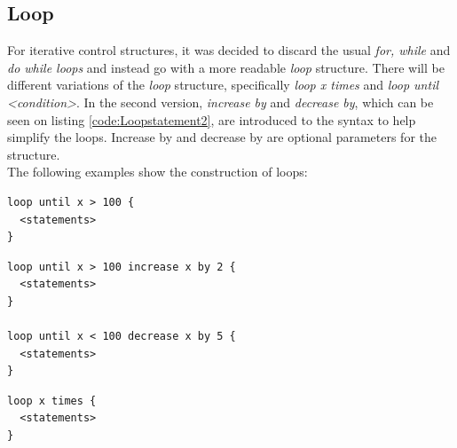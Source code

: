 \subsection{Loop}
For iterative control structures, it was decided to discard the usual \textit{for, while} and \textit{do while loops} and instead go with a more readable \textit{loop} structure. There will be different variations of the \textit{loop} structure, specifically \textit{loop x times} and \textit{loop until <condition>}. 
In the second version, \textit{increase by} and \textit{decrease by}, which can be seen on listing \ref{code:Loopstatement2}, are introduced to the syntax to help simplify the loops. 
Increase by and decrease by are optional parameters for the structure. \\
The following examples show the construction of loops:
\\
\begin{lstlisting}[caption={Example of a \textit{Loop} statement using until},label={code:Loopstatement1}]
loop until x > 100 {
  <statements>
}
\end{lstlisting}

\begin{lstlisting}[caption={Example of \textit{loop} statements using increase by and decrease by},label={code:Loopstatement2}]
loop until x > 100 increase x by 2 {
  <statements>
}

loop until x < 100 decrease x by 5 {
  <statements>
}
\end{lstlisting}

\begin{lstlisting}[caption={Example of a \textit{Loop} statement},label={code:Loopstatement3}]
loop x times {
  <statements>
}
\end{lstlisting}


